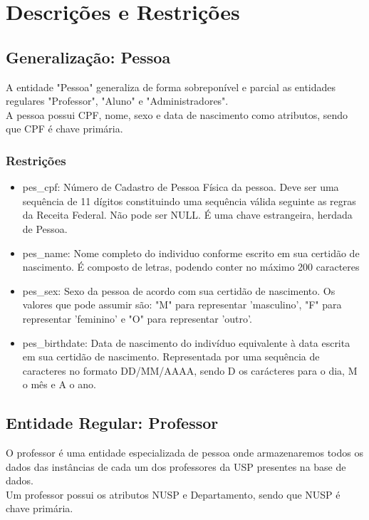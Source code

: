 \documentclass{article}
\begin{document}
  \section{Descrições e Restrições}
    \subsection{Generalização: Pessoa}
        \quad A entidade "Pessoa" generaliza de forma sobreponível e parcial as entidades regulares "Professor", "Aluno" e "Administradores". \\
        \null \quad A pessoa possui CPF, nome, sexo e data de nascimento como atributos, sendo que CPF é chave primária.
        \subsubsection{Restrições}
            \begin{itemize}
                \item pes\_cpf: Número de Cadastro de Pessoa Física da pessoa. Deve ser uma sequência de 11 dígitos constituindo uma sequência válida seguinte as regras da Receita Federal. Não pode ser NULL. É uma chave estrangeira, herdada de Pessoa.
                \item pes\_name: Nome completo do individuo conforme escrito em sua certidão de nascimento. É composto de letras, podendo conter no máximo 200 caracteres
                \item pes\_sex: Sexo da pessoa de acordo com sua certidão de nascimento. Os valores que pode assumir são: "M" para representar 'masculino', "F" para representar 'feminino' e "O" para representar 'outro'.
                \item pes\_birthdate: Data de nascimento do indivíduo equivalente à data escrita em sua certidão de nascimento. Representada por uma sequência de caracteres no formato DD/MM/AAAA, sendo D os carácteres para o dia, M o mês e A o ano.
            \end{itemize}
            
  	\subsection{Entidade Regular: Professor}
  		\quad O professor é uma entidade especializada de pessoa onde armazenaremos todos os dados das instâncias de cada um dos professores da USP presentes na base de dados. \\
  		\null \quad Um professor possui os atributos NUSP e Departamento, sendo que NUSP é chave primária.  
\end{document}
